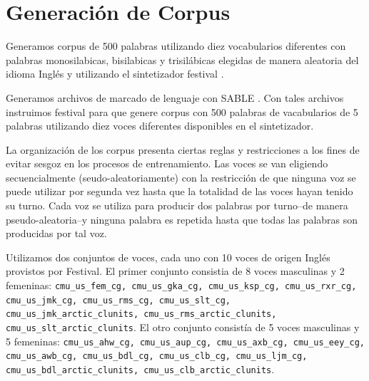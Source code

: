 




\section{Generación de Corpus}
\label{CorpGen}

Generamos corpus de 500 palabras utilizando diez vocabularios diferentes con palabras monosilabicas, bisilabicas y trisilábicas elegidas de manera aleatoria del idioma Inglés y utilizando el sintetizador \gls{festival} \cite{festival2014}.


Generamos archivos de marcado de lenguaje con SABLE \cite{sable}. Con tales archivos instruimos \gls{festival} para que genere corpus con 500  palabras de vacabularios de 5 palabras utilizando diez voces diferentes disponibles en el sintetizador.

La organización de los corpus presenta ciertas reglas y restricciones a los fines de evitar sesgoz en los procesos de entrenamiento. Las voces se van eligiendo secuencialmente (seudo-aleatoriamente) con la restricción de que ninguna voz se puede utilizar por segunda vez hasta que la totalidad de las voces hayan tenido su turno. Cada voz se utiliza para producir dos palabras por turno--de manera pseudo-aleatoria--y ninguna palabra es repetida hasta que todas las palabras son producidas por tal voz.


Utilizamos dos conjuntos de voces, cada uno con 10 voces de origen Inglés provistos por Festival. El primer conjunto consistia de 8 voces masculinas y 2 femeninas: \texttt{cmu\_us\_fem\_cg, cmu\_us\_gka\_cg, cmu\_us\_ksp\_cg, cmu\_us\_rxr\_cg, cmu\_us\_jmk\_cg, cmu\_us\_rms\_cg, cmu\_us\_slt\_cg, cmu\_us\_jmk\_arctic\_clunits, cmu\_us\_rms\_arctic\_clunits, cmu\_us\_slt\_arctic\_clunits}. El otro conjunto consistía de 5 voces masculinas y 5 femeninas: \texttt{cmu\_us\_ahw\_cg, cmu\_us\_aup\_cg, cmu\_us\_axb\_cg, cmu\_us\_eey\_cg, cmu\_us\_awb\_cg, cmu\_us\_bdl\_cg, cmu\_us\_clb\_cg, cmu\_us\_ljm\_cg, cmu\_us\_bdl\_arctic\_clunits, cmu\_us\_clb\_arctic\_clunits}.

